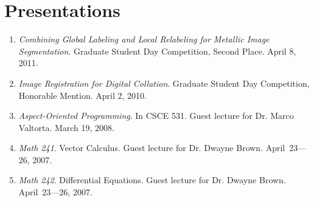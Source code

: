 \documentclass[a4paper,10pt]{article}
\begin{document}
\nocite{waggoner:11}
\nocite{wang:11}
\nocite{temlyakov:10}
\nocite{zhang:10}
\nocite{waggoner:12}
\nocite{barbu:12}
\nocite{zhang:12}

\renewcommand\refname{Publications}



\section{Presentations}
\begin{enumerate}
\renewcommand{\labelenumi}{[P\arabic{enumi}] }
\item \emph{Combining Global Labeling and Local Relabeling for Metallic Image Segmentation}. Graduate Student Day Competition, Second Place. April 8, 2011.
\item \emph{Image Registration for Digital Collation}. Graduate Student Day Competition, Honorable Mention. April 2, 2010.
\item \emph{Aspect-Oriented Programming}. In CSCE 531. Guest lecture for Dr. Marco Valtorta. March 19, 2008.
\item \emph{Math 241}. Vector Calculus. Guest lecture for Dr. Dwayne Brown. April~23---26, 2007. 
\item \emph{Math 242}. Differential Equations. Guest lecture for Dr. Dwayne Brown. April~23---26, 2007. 
\end{enumerate}

\end{document}
